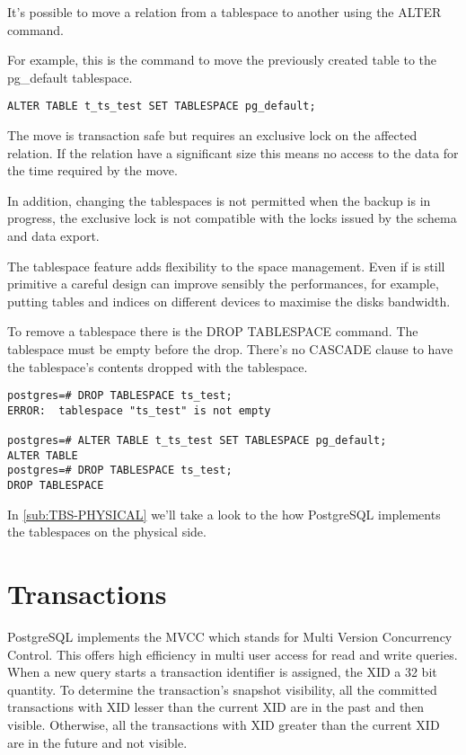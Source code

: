 It's possible to move a relation from a tablespace to another using the 
ALTER command.

For example, this is the command to move the previously created table to the 
pg\_default tablespace.

\begin{verbatim}
ALTER TABLE t_ts_test SET TABLESPACE pg_default;
\end{verbatim}

The move is transaction safe but requires an exclusive lock on the affected 
relation. If the relation have a significant size this means no access to 
the data for the time required by the move.

In addition, changing the tablespaces is not permitted when the backup is in 
progress, the exclusive lock is not compatible with the locks issued by the 
schema and data export.

The tablespace feature adds flexibility to the space management. Even if is 
still primitive a careful design can improve sensibly the performances, for 
example, putting tables and indices on different devices to maximise the disks 
bandwidth.

To remove a tablespace there is the  DROP TABLESPACE command. The tablespace 
must be empty before the drop. There's no CASCADE clause to have the 
tablespace's contents dropped with the tablespace.

\begin{verbatim}
postgres=# DROP TABLESPACE ts_test;
ERROR:  tablespace "ts_test" is not empty

postgres=# ALTER TABLE t_ts_test SET TABLESPACE pg_default;
ALTER TABLE
postgres=# DROP TABLESPACE ts_test;
DROP TABLESPACE

\end{verbatim}

In \ref{sub:TBS-PHYSICAL} we'll take a look to the how PostgreSQL 
implements the tablespaces on the physical side.

\section{Transactions}
\label{sec:TRANSACTION}
PostgreSQL implements the MVCC which stands for Multi Version 
Concurrency Control. 
This offers high efficiency in multi user access for read and write queries.
When a new query starts a transaction identifier is assigned, the XID 
 a 32 bit quantity. To determine the transaction's snapshot 
visibility, all the committed transactions with XID lesser than the current XID 
are in the past and then visible. Otherwise, all the transactions with XID 
greater than the current XID are in the future and not visible.\newline


